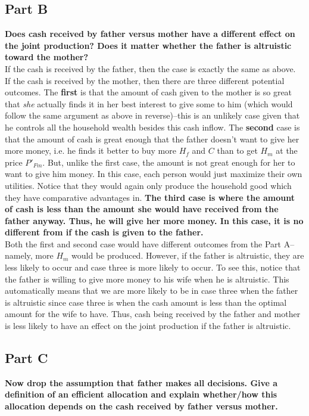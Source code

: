 \documentclass[12pt]{paper}
\begin{document}
\subsection*{Part B}
\textbf{Does cash received by father versus mother have a different
  effect on the joint production? Does it matter whether the father is
  altruistic toward the mother?}
\\

If the cash is received by the father, then the case is exactly the same as above.
\\

If the cash is received by the mother, then there are three different
potential outcomes. The \textbf{first} is that the amount of cash
given to the mother is so great that \textit{she} actually finds it in
her best interest to give some to him (which would follow the same
argument as above in reverse)--this is an unlikely case given that he
controls all the household wealth besides this cash inflow. The
\textbf{second} case is that the amount of cash is great enough that
the father doesn't want to give her more money, i.e. he finds it
better to buy more $H_f$ and $C$ than to get $H_m$ at the price
$P'_{Fm}$. But, unlike the first case, the amount is not great enough
for her to want to give him money. In this case, each person would
just maximize their own utilities. Notice that they would again only
produce the household good which they have comparative advantages
in. \textbf{The third case is where the amount of cash is less than
  the amount she would have received from the father anyway. Thus, he
  will give her more money. In this case, it is no different from if
  the cash is given to the father.}
\\

Both the first and second case would have different outcomes from the
Part A--namely, more $H_m$ would be produced. However, if the father is
altruistic, they are less likely to occur and case three is more
likely to occur. To see this, notice that the father is willing to
give more money to his wife when he is altruistic. This automatically
means that we are more likely to be in case three when the father is
altruistic since case three is when the cash amount is less than the
optimal amount for the wife to have. Thus, cash being received by the
father and mother is less likely to have an effect on the joint
production if the father is altruistic.

\subsection*{Part C}
\textbf{Now drop the assumption that father makes all decisions. Give a definition of an efficient allocation and explain whether/how this allocation depends on the cash received by father versus mother.}
\\
\end{document}
